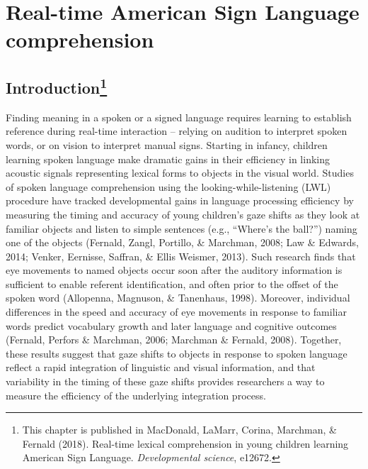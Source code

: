 \documentclass[oneside]{report}
\begin{document}
\hypertarget{sol}{%
\chapter{Real-time American Sign Language comprehension}\label{sol}}

\hypertarget{introduction-1}{%
\section[Introduction]{\texorpdfstring{Introduction\footnote{This
  chapter is published in MacDonald, LaMarr, Corina, Marchman, \&
  Fernald (2018). Real-time lexical comprehension in young children
  learning American Sign Language. \emph{Developmental science}, e12672.}}{Introduction}}\label{introduction-1}}

Finding meaning in a spoken or a signed language requires learning to
establish reference during real-time interaction -- relying on audition
to interpret spoken words, or on vision to interpret manual signs.
Starting in infancy, children learning spoken language make dramatic
gains in their efficiency in linking acoustic signals representing
lexical forms to objects in the visual world. Studies of spoken language
comprehension using the looking-while-listening (LWL) procedure have
tracked developmental gains in language processing efficiency by
measuring the timing and accuracy of young children's gaze shifts as
they look at familiar objects and listen to simple sentences (e.g.,
``Where's the ball?'') naming one of the objects (Fernald, Zangl,
Portillo, \& Marchman, 2008; Law \& Edwards, 2014; Venker, Eernisse,
Saffran, \& Ellis Weismer, 2013). Such research finds that eye movements
to named objects occur soon after the auditory information is sufficient
to enable referent identification, and often prior to the offset of the
spoken word (Allopenna, Magnuson, \& Tanenhaus, 1998). Moreover,
individual differences in the speed and accuracy of eye movements in
response to familiar words predict vocabulary growth and later language
and cognitive outcomes (Fernald, Perfors \& Marchman, 2006; Marchman \&
Fernald, 2008). Together, these results suggest that gaze shifts to
objects in response to spoken language reflect a rapid integration of
linguistic and visual information, and that variability in the timing of
these gaze shifts provides researchers a way to measure the efficiency
of the underlying integration process.
\end{document}
